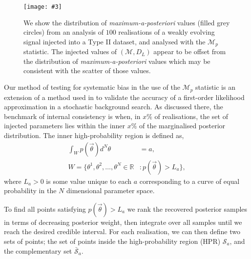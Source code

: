 \documentclass[twocolappendix,tighten]{emulateapj}
\newcommand{\incgraph}[3]{\texttt{[image: \#3]}}
\begin{document}
\begin{figure*}
  \centering
\incgraph{0}{0.8}{M1p8e8_Fgw2m8_SNR8_MaxPost.pdf}
\caption{\label{fig:MaxPost3}We show the distribution of {\it maximum-a-posteriori} values (filled grey circles) from an analysis of $100$ realisations of a weakly evolving signal injected into a Type II dataset, and analysed with the {\bf $\mathcal{M}_p$} statistic. The injected values of $(\mathcal{M},D_L)$ appear to be offset from the distribution of {\it maximum-a-posteriori} values which may be consistent with the scatter of those values. }
 \end{figure*}

Our method of testing for systematic bias in the use of the {\bf $\mathcal{M}_p$} statistic is an extension of a method used in \citet{ellis-first-order} to validate the accuracy of a first-order likelihood approximation in a stochastic background search. As discussed there, the benchmark of internal consistency is when, in $x\%$ of realisations, the set of injected parameters lies within the inner $x\%$ of the marginalised posterior distribution. The inner high-probability region is defined as,
\begin{align}
\int_W p(\vec\theta )d^N\theta &= a, \\\nonumber
W = \{\theta^1,\theta^2,\ldots,\theta^N\in\mathbb{R} &: p(\vec\theta )>L_a\},
\end{align}
where $L_a>0$ is some value unique to each $a$ corresponding to a curve of equal probability in the $N$ dimensional parameter space.

To find all points satisfying $p(\vec\theta )>L_a$  we rank the recovered posterior samples in terms of decreasing posterior weight, then integrate over all samples until we reach the desired credible interval. For each realisation, we can then define two sets of points; the set of points inside the high-probability region (HPR) $\mathcal{S}_a$, and the complementary set $\mathcal{\bar S}_a$.
\end{document}
